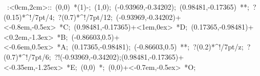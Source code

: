 %


\hbox{
\xy    <2cm,0cm>:<0cm,2cm>::
       (0,0) *\ellipse(1){-}; (1,0); 
       (-0.93969,-0.34202); (0.98481,-0.17365) **\dir{-}; 
       ?(0.15)*^!/7pt/{4};  ?(0.7)*^!/7pt/{12};  
       (-0.93969,-0.34202)+<-0.8em,-0.5ex> *{C}; 
       (0.98481,-0.17365)+<1em,0ex> *{D}; 
       (0.17365,-0.98481)+<0.2em,-1.3ex> *{B}; 
       (-0.86603,0.5)+<-0.6em,0.5ex> *{A}; 
       (0.17365,-0.98481); (-0.86603,0.5) **\dir{-};
       ?(0.2)*^!/7pt/{z};  ?(0.7)*^!/7pt/{6};  
  ?!{(-0.93969,-0.34202);(0.98481,-0.17365)}+<-0.35em,-1.25ex> 
                  *{E};
       (0,0) *{\bullet}; (0,0)+<-0.7em,-0.5ex> *{O};
\endxy}




